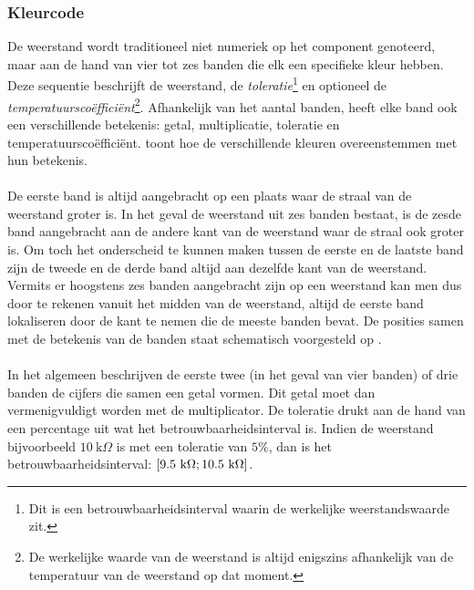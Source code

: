 \subsubsection{Kleurcode}
De weerstand wordt traditioneel niet numeriek op het component genoteerd, maar aan de hand van vier tot zes banden die elk een specifieke kleur hebben. Deze sequentie beschrijft de weerstand, de \emph{toleratie}\footnote{Dit is een betrouwbaarheidsinterval waarin de werkelijke weerstandswaarde zit.} en optioneel de \emph{temperatuursco\"effici\"ent}\footnote{De werkelijke waarde van de weerstand is altijd enigszins afhankelijk van de temperatuur van de weerstand op dat moment.}. Afhankelijk van het aantal banden, heeft elke band ook een verschillende betekenis: getal, multiplicatie, toleratie en temperatuursco\"effici\"ent.  toont hoe de verschillende kleuren overeenstemmen met hun betekenis.

\paragraph{}
De eerste band is altijd aangebracht op een plaats waar de straal van de weerstand groter is. In het geval de weerstand uit zes banden bestaat, is de zesde band aangebracht aan de andere kant van de weerstand waar de straal ook groter is. Om toch het onderscheid te kunnen maken tussen de eerste en de laatste band zijn de tweede en de derde band altijd aan dezelfde kant van de weerstand. Vermits er hoogstens zes banden aangebracht zijn op een weerstand kan men dus door te rekenen vanuit het midden van de weerstand, altijd de eerste band lokaliseren door de kant te nemen die de meeste banden bevat. De posities samen met de betekenis van de banden staat schematisch voorgesteld op .
\paragraph{}
In het algemeen beschrijven de eerste twee (in het geval van vier banden) of drie banden de cijfers die samen een getal vormen. Dit getal moet dan vermenigvuldigt worden met de multiplicator. De toleratie drukt aan de hand van een percentage uit wat het betrouwbaarheidsinterval is. Indien de weerstand bijvoorbeeld $10~\mbox{k}\Omega$ is met een toleratie van $5\%$, dan is het betrouwbaarheidsinterval: $\left[ 9.5~\mbox{k}\Omega ; 10.5~\mbox{k}\Omega \right]$.
